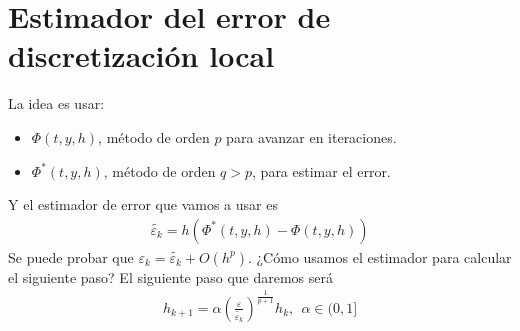 \section{Estimador del error de discretización local}
\noindent La idea es usar:
\begin{itemize}
    \item $\Phi(t,y,h)$, método de orden $p$ para avanzar en iteraciones.
    \item $\Phi^*(t,y,h)$, método de orden $q > p$, para estimar el error.
\end{itemize}
Y el estimador de error que vamos a usar es
\begin{align*}
    \widetilde{\varepsilon_k} = h(\Phi^*(t,y,h) - \Phi(t,y,h))
\end{align*}
Se puede probar que $\varepsilon_k = \widetilde{\varepsilon_k} + O(h^p)$. ¿Cómo usamos el estimador para calcular el siguiente paso? El siguiente paso que daremos será
\begin{align*}
    h_{k+1} = \alpha \left( \frac{\varepsilon}{\widetilde{\varepsilon_k}} \right)^{\frac{1}{p+1}}h_k, \ \ \alpha \in (0,1]
\end{align*}
